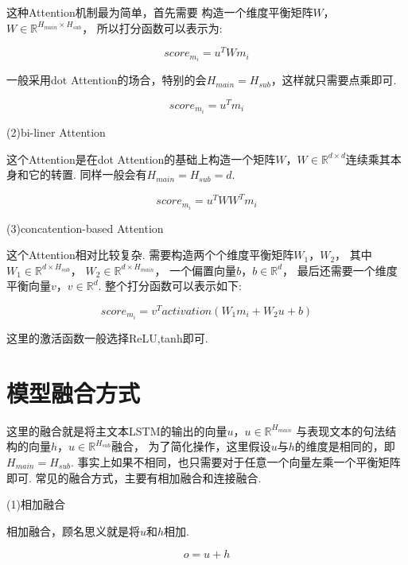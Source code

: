 \documentclass[bachelor,adobefonts]{jnuthesis}
\begin{document}
这种Attention机制最为简单，首先需要
构造一个维度平衡矩阵$W$，$W \in \mathbb{R}^{H_{main} \times H_{sub}}$，
所以打分函数可以表示为:

\begin{equation}
  score_{m_{i}} = u^{T}Wm_{i}
\end{equation}

一般采用dot Attention的场合，特别的会$H_{main} = H_{sub}$，这样就只需要点乘即可.

\begin{equation}
  score_{m_{i}} = u^{T}m_{i}
\end{equation}

(2)bi-liner Attention

这个Attention是在dot Attention的基础上构造一个矩阵$W$，$W \in \mathbb{R}^{d \times d}$连续乘其本身和它的转置.
同样一般会有$H_{main} = H_{sub} = d $.

\begin{equation}
  score_{m_{i}} = u^{T}WW^{T}m_{i}
\end{equation}


(3)concatention-based Attention

这个Attention相对比较复杂.
需要构造两个个维度平衡矩阵$W_{1}$，$W_{2}$，
其中$W_{1} \in \mathbb{R}^{d \times H_{sub}}$，
$W_{2} \in \mathbb{R}^{d \times H_{main}}$，
一个偏置向量$b$，$b \in \mathbb{R}^{d}$，
最后还需要一个维度平衡向量$v$，$v \in \mathbb{R}^{d}$.
整个打分函数可以表示如下:

\begin{equation}
  score_{m_{i}} = v^{T}activation(W_{1}m_{i}+W_{2}u+b)
\end{equation}

这里的激活函数一般选择ReLU,tanh即可.



\section{模型融合方式}
这里的融合就是将主文本LSTM的输出的向量$u$，$u \in \mathbb{R}^{H_{main}}$
与表现文本的句法结构的向量$h$，$u \in \mathbb{R}^{H_{sub}}$融合，
为了简化操作，这里假设$u$与$h$的维度是相同的，即$H_{main} = H_{sub}$.
事实上如果不相同，也只需要对于任意一个向量左乘一个平衡矩阵即可.
常见的融合方式，主要有相加融合和连接融合.

(1)相加融合

相加融合，顾名思义就是将$u$和$h$相加.

\begin{equation}
  o = u + h
\end{equation}
\end{document}
